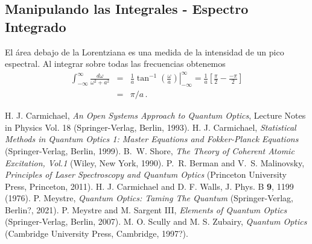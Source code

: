 \documentclass[twocolumn,aps,eqsecnum]{revtex4}
\begin{document}
\subsection{Manipulando las Integrales - Espectro Integrado} 
El \'area debajo de la Lorentziana es una medida de la intensidad de un 
pico espectral. Al integrar sobre todas las frecuencias obtenemos 
%
\begin{eqnarray} 
\int_{-\infty}^{\infty} \frac{d\omega}{\omega^2 +a^2} 
	&=& \left. \frac{1}{a} \tan^{-1}{\left( \frac{\omega}{a} \right)} 
		\right|_{-\infty}^{\infty} 
	=  \frac{1}{a} \left[ \frac{\pi}{2} -\frac{-\pi}{2} \right] 	\nonumber \\ 
	&=& \pi/a	\,.
\end{eqnarray}

\begin{references} 
%
 H. J. Carmichael, \textit{An Open Systems Approach to 
	Quantum Optics}, Lecture Notes in Physics Vol. 18 
	(Springer-Verlag, Berlin, 1993).
%
 H. J. Carmichael, \textit{Statistical Methods in Quantum 
Optics 1: Master Equations and Fokker-Planck Equations} (Springer-Verlag, 
Berlin, 1999). 
%
 B.~W. Shore, \textit{The Theory of Coherent Atomic 
Excitation, Vol.1} (Wiley, New York, 1990).
%
 P.~R. Berman and V.~S. Malinovsky, \textit{Principles 
of Laser Spectroscopy and Quantum Optics} (Princeton University Press, 
Princeton, 2011).
%
 H. J. Carmichael and D. F. Walls, J. Phys. B 
	\textbf{9}, 1199 (1976). 
%
 P. Meystre, \textit{Quantum Optics: Taming The Quantum} 
(Springer-Verlag, Berlin?, 2021). 
%
 P. Meystre and M. Sargent III, \textit{Elements of 
Quantum Optics} (Springer-Verlag, Berlin, 2007). 
%
 M. O. Scully and M. S. Zubairy, \textit{Quantum Optics} 
(Cambridge University Press, Cambridge, 1997?).



\end{references}
\end{document}
